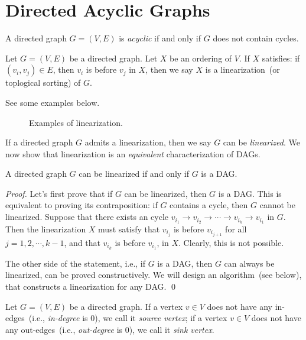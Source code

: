 \section{Directed Acyclic Graphs}

\begin{definition}[DAG]
A directed graph $G = (V, E)$ is \emph{acyclic} if and only if $G$ does not contain cycles.
\end{definition}

\begin{definition}
Let $G = (V,E)$ be a directed graph. Let $X$ be an ordering of $V$.
If $X$ satisfies: if $(v_i, v_j)\in E$, then $v_i$ is before $v_j$ in $X$,
then we say $X$ is a linearization~(or toplogical sorting) of $G$.
\end{definition}


See some examples below.

\begin{figure}[h!]
\centering{}
\caption{Examples of linearization.}
\end{figure}

If a directed graph $G$ admits a linearization, then we say $G$ can be \emph{linearized}.
We now show that linearization is an \emph{equivalent} characterization of DAGs.

\begin{claim}
A directed graph $G$ can be linearized if and only if $G$ is a DAG.
\label{claim:dag}
\end{claim}

\emph{Proof.}  Let's first prove that if $G$ can be linearized, then $G$ is a DAG.
This is equivalent to proving its contraposition: if $G$ contains a cycle, then $G$ cannot be linearized.
Suppose that there exists an cycle $v_{i_1} \to v_{i_2} \to \cdots \to v_{i_k} \to v_{i_1}$ in $G$.
Then the linearization $X$ must satisfy that $v_{i_{j}}$ is before $v_{i_{j+1}}$ for all $j = 1, 2, \cdots, k-1$,
and that $v_{i_{k}}$ is before $v_{i_1}$, in $X$. Clearly, this is not possible.

The other side of the statement, i.e., if $G$ is a DAG, then $G$ can always be linearized, can be proved constructively.
We will design an algorithm~(see below), that constructs a linearization for any DAG. \qed


Let $G = (V, E)$ be a directed graph. 
If a vertex $v\in V$ does not have any in-edges~(i.e., \emph{in-degree} is 0), we call it \emph{source vertex};
if a vertex $v\in V$ does not have any out-edges~(i.e., \emph{out-degree} is 0), we call it \emph{sink vertex}.

